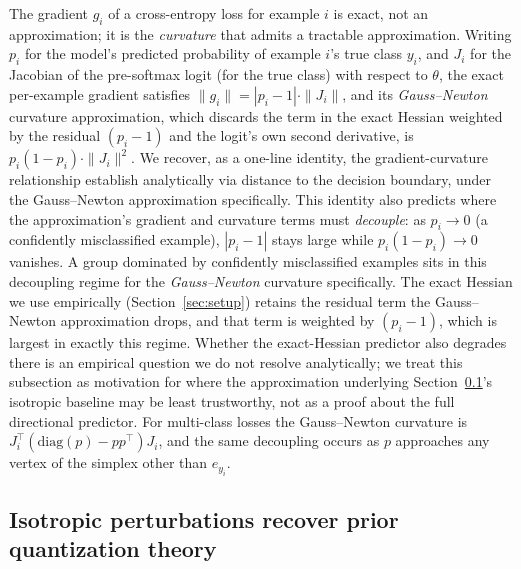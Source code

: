 \documentclass{article}
\begin{document}
The gradient $g_i$ of a cross-entropy loss for example $i$ is exact, not an approximation; it is the \emph{curvature} that admits a tractable approximation. Writing $p_i$ for the model's predicted probability of example $i$'s true class $y_i$, and $J_i$ for the Jacobian of the pre-softmax logit (for the true class) with respect to $\theta$, the exact per-example gradient satisfies $\|g_i\| = |p_i - 1|\cdot\|J_i\|$, and its \emph{Gauss--Newton} curvature approximation, which discards the term in the exact Hessian weighted by the residual $(p_i-1)$ and the logit's own second derivative, is $p_i(1-p_i)\cdot\|J_i\|^2$. We recover, as a one-line identity, the gradient-curvature relationship \citet{tran2022pruning} establish analytically via distance to the decision boundary, under the Gauss--Newton approximation specifically. This identity also predicts where the approximation's gradient and curvature terms must \emph{decouple}: as $p_i \to 0$ (a confidently misclassified example), $|p_i - 1|$ stays large while $p_i(1-p_i)\to 0$ vanishes. A group dominated by confidently misclassified examples sits in this decoupling regime for the \emph{Gauss--Newton} curvature specifically. The exact Hessian we use empirically (Section~\ref{sec:setup}) retains the residual term the Gauss--Newton approximation drops, and that term is weighted by $(p_i-1)$, which is largest in exactly this regime. Whether the exact-Hessian predictor also degrades there is an empirical question we do not resolve analytically; we treat this subsection as motivation for where the approximation underlying Section~\ref{sec:isotropic-special-case}'s isotropic baseline may be least trustworthy, not as a proof about the full directional predictor. For multi-class losses the Gauss--Newton curvature is $J_i^\top(\mathrm{diag}(p) - pp^\top)J_i$, and the same decoupling occurs as $p$ approaches any vertex of the simplex other than $e_{y_i}$.

\subsection{Isotropic perturbations recover prior quantization theory}
\label{sec:isotropic-special-case}
\end{document}
